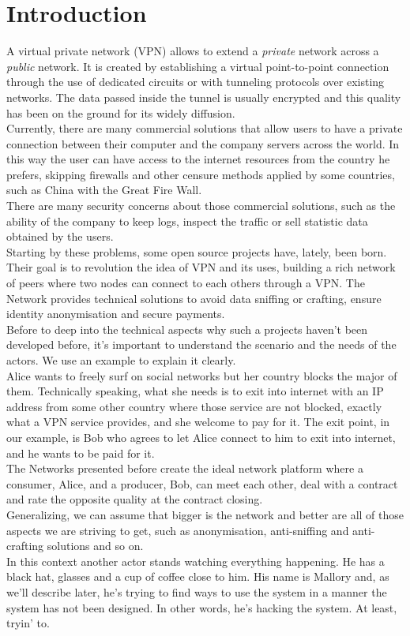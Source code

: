 \documentclass[]{article}
\begin{document}
	\section{Introduction}
	A virtual private network (VPN) allows to extend a \textit{private} network across a \textit{public} network. It is created by establishing a virtual point-to-point connection through the use of dedicated circuits or with tunneling protocols over existing networks. The data passed inside the tunnel is usually encrypted and this quality has been on the ground for its widely diffusion.\\
	
	Currently, there are many commercial solutions that allow users to have a private connection between their computer and the company servers across the world. In this way the user can have access to the internet resources from the country he prefers, skipping firewalls and other censure methods applied by some countries, such as China with the Great Fire Wall.\\
	There are many security concerns about those commercial solutions, such as the ability of the company to keep logs, inspect the traffic or sell statistic data obtained by the users.\\
	Starting by these problems, some open source projects have, lately, been born. Their goal is to revolution the idea of VPN and its uses, building a rich network of peers where two nodes can connect to each others through a VPN. The Network provides technical solutions to avoid data sniffing or crafting, ensure identity anonymisation and secure payments.\\
	
	Before to deep into the technical aspects why such a projects haven't been developed before, it's important to understand the scenario and the needs of the actors. We use an example to explain it clearly.\\
	Alice wants to freely surf on social networks but her country blocks the major of them. Technically speaking, what she needs is to exit into internet with an IP address from some other country where those service are not blocked, exactly what a VPN service provides, and she welcome to pay for it. 
	The exit point, in our example, is Bob who agrees to let Alice connect to him to exit into internet, and he wants to be paid for it.\\
	The Networks presented before create the ideal network platform where a consumer, Alice, and a producer, Bob, can meet each other, deal with a contract and rate the opposite quality at the contract closing.\\
	Generalizing, we can assume that bigger is the network and better are all of those aspects we are striving to get, such as anonymisation, anti-sniffing and anti-crafting solutions and so on.\\
	In this context another actor stands watching everything happening. He has a black hat, glasses and a cup of coffee close to him. His name is Mallory and, as we'll describe later, he's trying to find ways to use the system in a manner the system has not been designed. In other words, he's hacking the system. At least, tryin' to.\\
	
\end{document}
